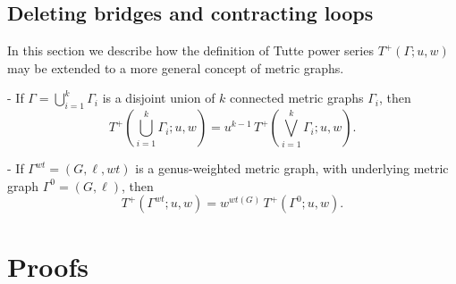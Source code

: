\documentclass{amsart}
\theoremstyle{definition}
\begin{document}

\subsection{Deleting bridges and contracting loops}
In this section we describe how the definition of Tutte power series $T^+(\Gamma;u,w)$
may be extended to a more general concept of metric graphs.

- If $\Gamma = \bigcup_{i=1}^k \Gamma_i$ is a disjoint union of $k$ connected metric graphs $\Gamma_i$,
then 
$$
T^+(\bigcup_{i=1}^k \Gamma_i ; u,w) = u^{k-1}\, T^+(\bigvee_{i=1}^k \Gamma_i; u,w).
$$

- If $\Gamma^{wt} = (G,\ell,wt)$ is a genus-weighted metric graph,
with underlying metric graph $\Gamma^0 = (G,\ell)$,
then
$$
T^+(\Gamma^{wt}; u,w) = w^{wt(G)} \, T^+(\Gamma^0; u,w).
$$


\section{Proofs}
\end{document}
